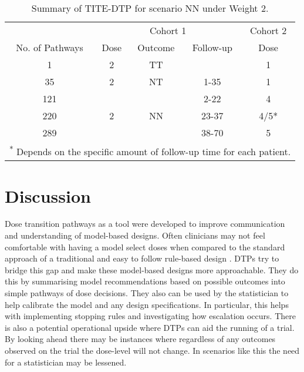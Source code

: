 \begin{table}[H]
	\centering
	\caption{Summary of TITE-DTP for scenario NN under Weight 2.}
	\label{tab_tite-dtp:AltweightW2DTP}
	\begin{tabular}{ccccc}
		\hline
		\multicolumn{1}{l}{} &                 \multicolumn{3}{c}{Cohort 1}    & Cohort 2 \\ 
		\cmidrule(l{3pt}r{3pt}){2-4} \cmidrule(l{3pt}r{3pt}){5-5}
		No. of Pathways   & Dose  				& Outcome             & Follow-up 		& Dose     \\ \hline
		1                 & 2               	& TT                  &          		& 1        \\ \hline
		35                & 2            		& NT                  & 1-35      		& 1        \\ \hline
		121   			  & \multirow{3}{*}{2}  & \multirow{3}{*}{NN} & 2-22      		& 4        \\
		220				  &                		&                     & 23-37           & 4/5*        \\
		289				  &              		&                     & 38-70     		& 5        \\ \hline
	   \multicolumn{5}{l}{\rule{0pt}{1em}\textsuperscript{*}  Depends on the specific amount of follow-up time for each patient.}\\
	\end{tabular}
\end{table}

\section{Discussion}
\label{tite-dtp:Discussion}

Dose transition pathways as a tool were developed to improve communication and understanding of model-based designs. Often clinicians may not feel comfortable with having a model select doses when compared to the standard approach of a traditional and easy to follow rule-based design \cite{jakiUptakeNovelStatistical2013}. DTPs try to bridge this gap and make these model-based designs more approachable. They do this by summarising model recommendations based on possible outcomes into simple pathways of dose decisions. They also can be used by the statistician to help calibrate the model and any design specifications. In particular, this helps with implementing stopping rules and investigating how escalation occurs. There is also a potential operational upside where DTPs can aid the running of a trial. By looking ahead there may be instances where regardless of any outcomes observed on the trial the dose-level will not change. In scenarios like this the need for a statistician may be lessened. 

